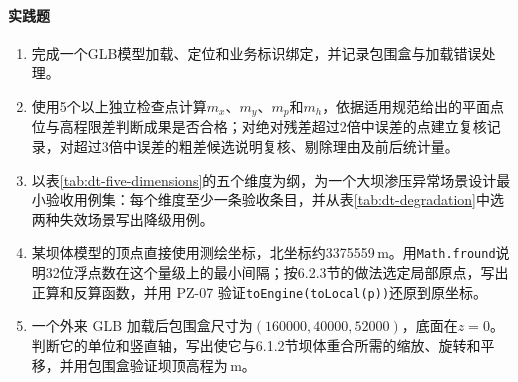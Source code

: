 \paragraph{实践题}
\begin{enumerate}[resume]
\item 完成一个GLB模型加载、定位和业务标识绑定，并记录包围盒与加载错误处理。
\item 使用5个以上独立检查点计算$m_x$、$m_y$、$m_p$和$m_h$，依据适用规范给出的平面点位与高程限差判断成果是否合格；对绝对残差超过2倍中误差的点建立复核记录，对超过3倍中误差的粗差候选说明复核、剔除理由及前后统计量。
\item 以表\ref{tab:dt-five-dimensions}的五个维度为纲，为一个大坝渗压异常场景设计最小验收用例集：每个维度至少一条验收条目，并从表\ref{tab:dt-degradation}中选两种失效场景写出降级用例。
\item 某坝体模型的顶点直接使用测绘坐标，北坐标约3375559\,m。用\texttt{Math.fround}说明32位浮点数在这个量级上的最小间隔；按6.2.3节的做法选定局部原点，写出正算和反算函数，并用 PZ-07 验证\texttt{toEngine(toLocal(p))}还原到原坐标。
\item 一个外来 GLB 加载后包围盒尺寸为$(160000,40000,52000)$，底面在$z=0$。判断它的单位和竖直轴，写出使它与6.1.2节坝体重合所需的缩放、旋转和平移，并用包围盒验证坝顶高程为\cpCrestElev\,m。
\end{enumerate}
